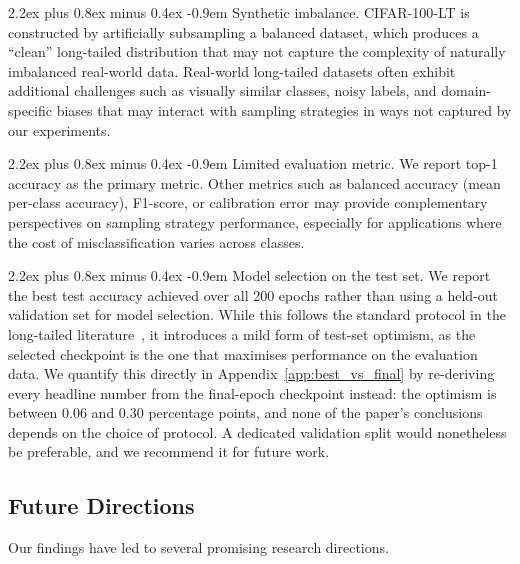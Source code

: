\documentclass[12pt,a4paper]{article}
\makeatletter
\renewcommand{\paragraph}{\@startsection{paragraph}{4}{\z@}%
  {2.2ex plus 0.8ex minus 0.4ex}%
  {-0.9em}%
  {\normalfont\normalsize\bfseries}}
\makeatother
\begin{document}
\paragraph{Synthetic imbalance.} CIFAR-100-LT is constructed by artificially subsampling a balanced dataset, which produces a ``clean'' long-tailed distribution that may not capture the complexity of naturally imbalanced real-world data. Real-world long-tailed datasets often exhibit additional challenges such as visually similar classes, noisy labels, and domain-specific biases that may interact with sampling strategies in ways not captured by our experiments.

\paragraph{Limited evaluation metric.} We report top-1 accuracy as the primary metric. Other metrics such as balanced accuracy (mean per-class accuracy), F1-score, or calibration error may provide complementary perspectives on sampling strategy performance, especially for applications where the cost of misclassification varies across classes.

\paragraph{Model selection on the test set.} We report the best test accuracy achieved over all 200 epochs rather than using a held-out validation set for model selection. While this follows the standard protocol in the long-tailed literature~\citep{cao2019learning, zhang2023deep}, it introduces a mild form of test-set optimism, as the selected checkpoint is the one that maximises performance on the evaluation data. We quantify this directly in Appendix~\ref{app:best_vs_final} by re-deriving every headline number from the final-epoch checkpoint instead: the optimism is between $0.06$ and $0.30$ percentage points, and none of the paper's conclusions depends on the choice of protocol. A dedicated validation split would nonetheless be preferable, and we recommend it for future work.


\subsection{Future Directions}

Our findings have led to several promising research directions.
\end{document}
